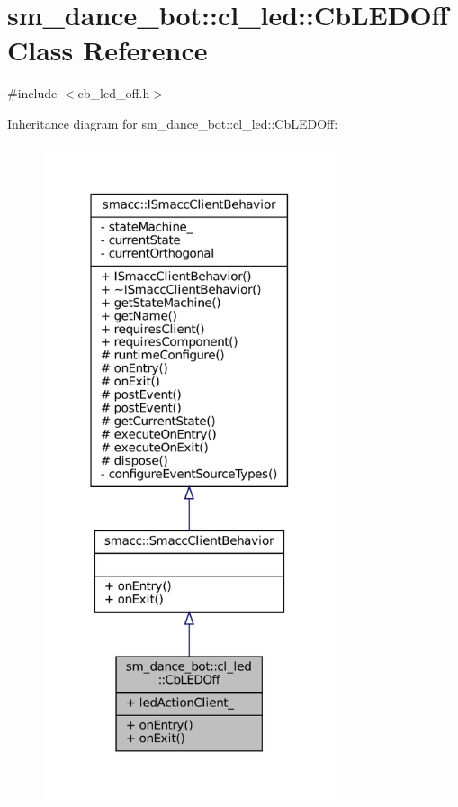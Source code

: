 \hypertarget{classsm__dance__bot_1_1cl__led_1_1CbLEDOff}{}\section{sm\+\_\+dance\+\_\+bot\+:\+:cl\+\_\+led\+:\+:Cb\+L\+E\+D\+Off Class Reference}
\label{classsm__dance__bot_1_1cl__led_1_1CbLEDOff}


{\ttfamily \#include $<$cb\+\_\+led\+\_\+off.\+h$>$}



Inheritance diagram for sm\+\_\+dance\+\_\+bot\+:\+:cl\+\_\+led\+:\+:Cb\+L\+E\+D\+Off\+:
\nopagebreak
\begin{figure}[H]
\begin{center}
\leavevmode
\includegraphics[width=244pt]{classsm__dance__bot_1_1cl__led_1_1CbLEDOff__inherit__graph}
\end{center}
\end{figure}


